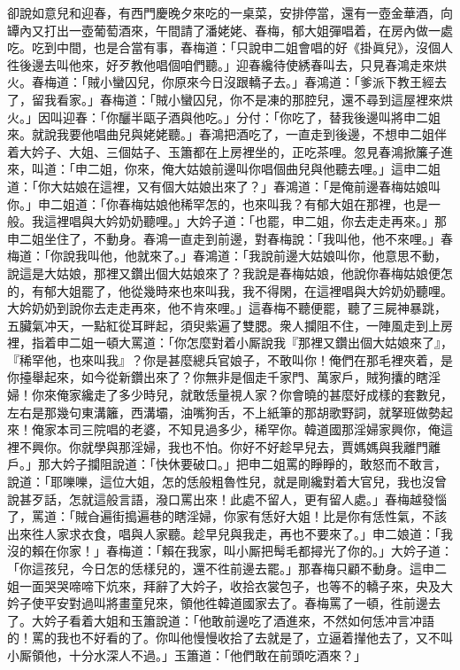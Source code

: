 卻說如意兒和迎春，有西門慶晚夕來吃的一桌菜，安排停當，還有一壺金華酒，{}向罈內又打出一壺葡萄酒來，午間請了潘姥姥、春梅，郁大姐彈唱着，在房內做一處吃。吃到中間，也是合當有事，春梅道：「只說申二姐會唱的好《掛眞兒》，沒個人徃後邊去叫他來，好歹教他唱個咱們聽。」迎春纔待使綉春叫去，只見春鴻走來烘火。春梅道：「賊小蠻囚兒，你原來今日沒跟轎子去。」春鴻道：「爹派下教王經去了，留我看家。」春梅道：「賊小蠻囚兒，你不是凍的那腔兒，還不尋到這屋裡來烘火。」因叫迎春：「你釃半甌子酒與他吃。」分付：「你吃了，替我後邊叫將申二姐來。就說我要他唱曲兒與姥姥聽。」春鴻把酒吃了，一直走到後邊，不想申二姐伴着大妗子、大姐、三個姑子、玉簫都在上房裡坐的，正吃茶哩。忽見春鴻掀簾子進來，叫道：「申二姐，你來，俺大姑娘前邊叫你唱個曲兒與他聽去哩。」這申二姐道：「你大姑娘在這裡，又有個大姑娘出來了？」春鴻道：「是俺前邊春梅姑娘叫你。」申二姐道：「你春梅姑娘他稀罕怎的，也來叫我？有郁大姐在那裡，也是一般。我這裡唱與大妗奶奶聽哩。」大妗子道：「也罷，申二姐，你去走走再來。」那申二姐坐住了，不動身。{}春鴻一直走到前邊，對春梅說：「我叫他，他不來哩。」春梅道：「你說我叫他，他就來了。」春鴻道：「我說前邊大姑娘叫你，他意思不動，說這是大姑娘，那裡又鑽出個大姑娘來了？我說是春梅姑娘，他說你春梅姑娘便怎的，有郁大姐罷了，他從幾時來也來叫我，我不得閑，在這裡唱與大妗奶奶聽哩。大妗奶奶到說你去走走再來，他不肯來哩。」這春梅不聽便罷，聽了三屍神暴跳，五臟氣冲天，一點紅從耳畔起，須臾紫遍了雙腮。衆人攔阻不住，一陣風走到上房裡，指着申二姐一頓大罵道：「你怎麼對着小厮說我『那裡又鑽出個大姑娘來了』，『稀罕他，也來叫我』？你是甚麼總兵官娘子，不敢叫你！俺們在那毛裡夾着，是你擡舉起來，如今從新鑽出來了？你無非是個走千家門、萬家戶，賊狗攮的瞎淫婦！你來俺家纔走了多少時兒，就敢恁量視人家？你會曉的甚麼好成樣的套數兒，左右是那幾句東溝籬，西溝壩，油嘴狗舌，不上紙筆的那胡歌野詞，就拏班做勢起來！俺家本司三院唱的老婆，不知見過多少，稀罕你。韓道國那淫婦家興你，俺這裡不興你。{}你就學與那淫婦，我也不怕。你好不好趁早兒去，賈媽媽與我離門離戶。」那大妗子攔阻說道：「快休要破口。」把申二姐罵的睜睜的，敢怒而不敢言，說道：「耶嚛嚛，這位大姐，怎的恁般粗魯性兒，就是剛纔對着大官兒，我也沒曾說甚歹話，怎就這般言語，潑口罵出來！此處不留人，更有留人處。」春梅越發惱了，罵道：「賊㒲遍街搗遍巷的瞎淫婦，你家有恁好大姐！比是你有恁性氣，不該出來徃人家求衣食，唱與人家聽。趁早兒與我走，再也不要來了。」申二娘道：「我沒的賴在你家！」春梅道：「賴在我家，叫小厮把髩毛都撏光了你的。」{}大妗子道：「你這孩兒，今日怎的恁樣兒的，還不徃前邊去罷。」那春梅只顧不動身。這申二姐一面哭哭啼啼下炕來，拜辭了大妗子，收拾衣裳包子，也等不的轎子來，央及大妗子使平安對過叫將畫童兒來，領他徃韓道國家去了。春梅罵了一頓，徃前邊去了。大妗子看着大姐和玉簫說道：「他敢前邊吃了酒進來，不然如何恁冲言冲語的！罵的我也不好看的了。你叫他慢慢收拾了去就是了，立逼着攆他去了，又不叫小厮領他，十分水深人不過。」玉簫道：「他們敢在前頭吃酒來？」

